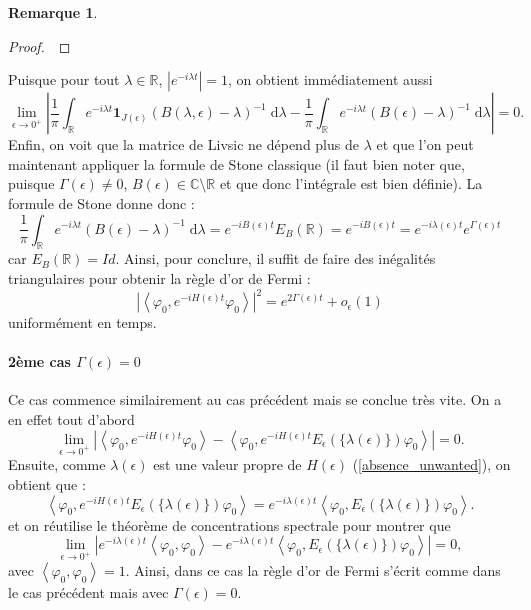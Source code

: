 \documentclass[12pt,openany,a4paper, titlepage]{article}
\newcommand{\f}[2]{\frac{#1}{#2}}
\newcommand{\lp}{\left(}
\newcommand{\rp}{\right)}
\newcommand{\la}{\left\langle}
\newcommand{\ra}{\right\rangle}
\newcommand{\dd}{\;\mathrm{d}}
\newcommand{\R}{\mathbb{R}}
\newcommand{\C}{\mathbb{C}}
\newcommand{\vp}{\varphi}
\theoremstyle{definition}
\theoremstyle{definition}
\theoremstyle{definition}
\theoremstyle{definition}
\theoremstyle{definition}
\newtheorem{rem}{Remarque}
\theoremstyle{definition}
\begin{document}
\begin{rem}
\begin{proof}
\,

\end{proof}

Puisque pour tout $\lambda \in \R$, $|e^{-i\lambda t}| = 1$, on obtient immédiatement aussi
\begin{equation}
            \lim\limits_{\epsilon \rightarrow 0^+} \left| \f{1}{\pi} \int_\R e^{-i\lambda t}\mathbf{1}_{J(\epsilon)}\lp  B(\lambda,\epsilon) - \lambda \rp^{-1} \dd \lambda - \f{1}{\pi} \int_\R e^{-i\lambda t}\lp B(\epsilon) - \lambda \rp^{-1} \dd \lambda \right|= 0.
    \end{equation}
Enfin, on voit que la matrice de Livsic ne dépend plus de $\lambda$ et que l'on peut maintenant appliquer la formule de Stone classique (il faut bien noter que, puisque $\Gamma(\epsilon) \neq 0$, $B(\epsilon)\in\C\setminus\R$ et que donc l'intégrale est bien définie). La formule de Stone donne donc :
\begin{equation}
    \f{1}{\pi} \int_\R e^{-i\lambda t}\lp B(\epsilon) - \lambda \rp^{-1} \dd \lambda = e^{-iB(\epsilon)t}E_B(\R) = e^{-iB(\epsilon)t} = e^{-i\lambda(\epsilon)t}e^{\Gamma(\epsilon)t}
\end{equation}
car $E_B(\R) = Id$. Ainsi, pour conclure, il suffit de faire des inégalités triangulaires pour obtenir la règle d'or de Fermi :
\begin{equation}
    \left|\la \vp_0, e^{-iH(\epsilon)t} \vp_0 \ra \right|^2 = e^{2\Gamma(\epsilon)t} + o_{\epsilon}(1)
\end{equation}
uniformément en temps.


\paragraph{2ème cas $\Gamma(\epsilon) = 0$}
Ce cas commence similairement au cas précédent mais se conclue très vite. On a en effet tout d'abord 
\begin{equation}
    \lim\limits_{\epsilon \rightarrow 0^+} \left|\la \vp_0, e^{-iH(\epsilon)t} \vp_0 \ra - \la \vp_0, e^{-iH(\epsilon)t} E_\epsilon(\{\lambda(\epsilon)\})\vp_0 \ra \right| = 0.
\end{equation}
Ensuite, comme $\lambda(\epsilon)$ est une valeur propre de $H(\epsilon)$ (\ref{absence_unwanted}), on obtient que :
\begin{equation}
    \la \vp_0, e^{-iH(\epsilon)t} E_\epsilon(\{\lambda(\epsilon)\})\vp_0 \ra  = e^{-i\lambda(\epsilon)t}\la \vp_0,  E_\epsilon(\{\lambda(\epsilon)\})\vp_0 \ra.
\end{equation}
et on réutilise le théorème de concentrations spectrale pour montrer que 
\begin{equation}
    \lim\limits_{\epsilon \rightarrow 0^+} \left|e^{-i\lambda(\epsilon)t} \la \vp_0, \vp_0 \ra - e^{-i\lambda(\epsilon)t}\la \vp_0, E_\epsilon(\{\lambda(\epsilon)\})\vp_0 \ra \right| = 0,
\end{equation}
avec $\la \vp_0, \vp_0 \ra = 1$.
Ainsi, dans ce cas la règle d'or de Fermi s'écrit comme dans le cas précédent mais avec $\Gamma(\epsilon) = 0$.




\end{rem}
\end{document}
